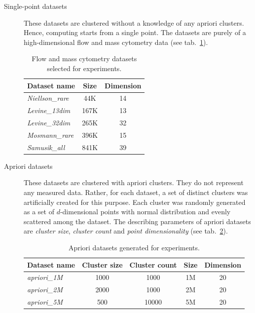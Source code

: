 \begin{description}
	\item[Single-point datasets] These datasets are clustered without a knowledge of any apriori clusters. Hence, computing starts from a single point. The datasets are purely of a high-dimensional flow and mass cytometry data \cite{flowrepo} (see tab.~\ref{tab04:single}).
	
	\begin{table}
		\centering
		\begin{tabular}{lcc}
			\toprule
			\textbf{Dataset name} & \textbf{Size} & \textbf{Dimension} \\ \midrule
			\emph{Niellson\_rare} &      44K      &         14         \\
			\emph{Levine\_13dim}  &     167K      &         13         \\
			\emph{Levine\_32dim}  &     265K      &         32         \\
			\emph{Mosmann\_rare}  &     396K      &         15         \\
			\emph{Samusik\_all}   &     841K      &         39         \\ \bottomrule
		\end{tabular}
	\caption{Flow and mass cytometry datasets selected for experiments.}
	\label{tab04:single}
	\end{table}

	\item[Apriori datasets] These datasets are clustered with apriori clusters. They do not represent any measured data. Rather, for each dataset, a set of distinct clusters was artificially created for this purpose. Each cluster was randomly generated as a set of $d$-dimensional points with normal distribution and evenly scattered among the dataset. The describing parameters of apriori datasets are \emph{cluster size}, \emph{cluster count} and \emph{point dimensionality} (see tab.~\ref{tab04:apriori}).
	
	\begin{table}
		\centering
		\begin{tabular}{lcccc}
			\toprule
			\textbf{Dataset name} & \textbf{Cluster size} & \textbf{Cluster count} & \textbf{Size} & \textbf{Dimension} \\ \midrule
			\emph{apriori\_1M}     &         1000          &          1000          &      1M       &         20         \\
			\emph{apriori\_2M}     &         2000          &          1000          &      2M       &         20         \\
			\emph{apriori\_5M}     &          500          &         10000          &      5M       &         20         \\ \bottomrule
		\end{tabular}
		\caption{Apriori datasets generated for experiments.}
		\label{tab04:apriori}
	\end{table}
	
\end{description}

